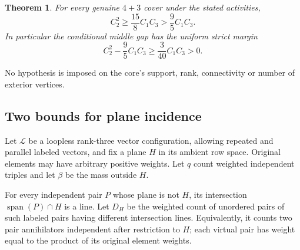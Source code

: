 \documentclass[11pt,a4paper]{article}
\newtheorem{theorem}{Theorem}[section]
\theoremstyle{remark}\newtheorem{remark}[theorem]{Remark}
\newcommand{\spn}{\operatorname{span}}     %
\begin{document}
\begin{theorem}\label{mrn:e:r7:thm:middle}
For every genuine $4+3$ cover under the stated activities,
\begin{equation}\label{mrn:e:r7:eq:middle}
 C_2^2\ge\frac{15}{8}C_1C_3>\frac95C_1C_3.
\end{equation}
In particular the conditional middle gap has the uniform strict margin
\[
 C_2^2-\frac95C_1C_3\ge\frac3{40}C_1C_3>0.
\]
\end{theorem}
No hypothesis is imposed on the core's support, rank, connectivity or number of exterior vertices.

\subsection{Two bounds for plane incidence}
Let $\mathcal L$ be a loopless rank-three vector configuration, allowing repeated and parallel labeled vectors, and fix a plane $H$ in its ambient row space. Original elements may have arbitrary positive weights. Let $q$ count weighted independent triples and let $\beta$ be the mass outside $H$.

For every independent pair $P$ whose plane is not $H$, its intersection $\spn(P)\cap H$ is a line. Let $D_H$ be the weighted count of unordered pairs of such labeled pairs having different intersection lines. Equivalently, it counts two pair annihilators independent after restriction to $H$; each virtual pair has weight equal to the product of its original element weights.
\end{document}

